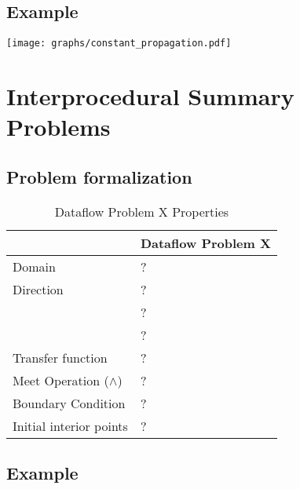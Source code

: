 \documentclass{article}
\begin{document}
\subsection{Example}

\texttt{[image: graphs/constant\_propagation.pdf]}

\section{Interprocedural Summary Problems}

\subsection{Problem formalization}

\begin{table}[H]
\centering
\begin{tabular}{|p{}|p{}|}
\hline
 & \textbf{Dataflow Problem X} \\
\hline
Domain & ? \\
\hline
Direction & ? \\
 & ? \\
 & ? \\
\hline
Transfer function & ? \\
\hline
Meet Operation ($\wedge$) & ? \\
\hline
Boundary Condition & ? \\
\hline
Initial interior points & ? \\
\hline
\end{tabular}
\caption{Dataflow Problem X Properties}
\label{tab:dataflow_problem_x}
\end{table}

\subsection{Example}
\end{document}
